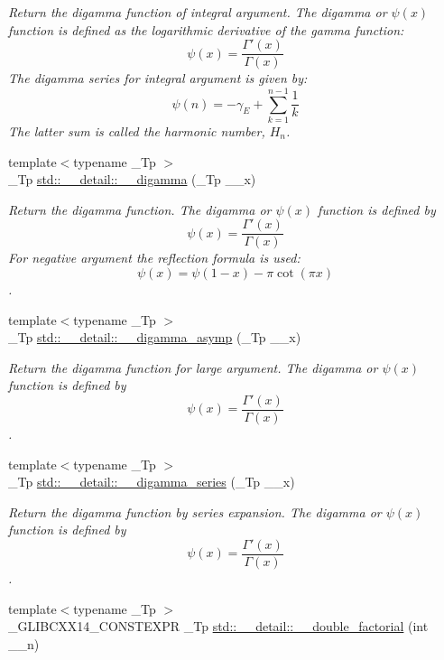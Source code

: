 \begin{DoxyCompactItemize}
\begin{DoxyCompactList}\small\item\em Return the digamma function of integral argument. The digamma or $ \psi(x) $ function is defined as the logarithmic derivative of the gamma function\+: \[ \psi(x) = \frac{\Gamma'(x)}{\Gamma(x)} \] The digamma series for integral argument is given by\+: \[ \psi(n) = -\gamma_E + \sum_{k=1}^{n-1} \frac{1}{k} \] The latter sum is called the harmonic number, $ H_n $. \end{DoxyCompactList}\item 
{\footnotesize template$<$typename \+\_\+\+Tp $>$ }\\\+\_\+\+Tp \hyperlink{namespacestd_1_1____detail_af83cdc6dd8c24e164b8c71491c4b0080}{std\+::\+\_\+\+\_\+detail\+::\+\_\+\+\_\+digamma} (\+\_\+\+Tp \+\_\+\+\_\+x)
\begin{DoxyCompactList}\small\item\em Return the digamma function. The digamma or $ \psi(x) $ function is defined by \[ \psi(x) = \frac{\Gamma'(x)}{\Gamma(x)} \] For negative argument the reflection formula is used\+: \[ \psi(x) = \psi(1-x) - \pi \cot(\pi x) \]. \end{DoxyCompactList}\item 
{\footnotesize template$<$typename \+\_\+\+Tp $>$ }\\\+\_\+\+Tp \hyperlink{namespacestd_1_1____detail_a5264ad32c92b701acb90b543a1a96521}{std\+::\+\_\+\+\_\+detail\+::\+\_\+\+\_\+digamma\+\_\+asymp} (\+\_\+\+Tp \+\_\+\+\_\+x)
\begin{DoxyCompactList}\small\item\em Return the digamma function for large argument. The digamma or $ \psi(x) $ function is defined by \[ \psi(x) = \frac{\Gamma'(x)}{\Gamma(x)} \]. \end{DoxyCompactList}\item 
{\footnotesize template$<$typename \+\_\+\+Tp $>$ }\\\+\_\+\+Tp \hyperlink{namespacestd_1_1____detail_ae9d54f73a3e05c2b242e992a0a93d5de}{std\+::\+\_\+\+\_\+detail\+::\+\_\+\+\_\+digamma\+\_\+series} (\+\_\+\+Tp \+\_\+\+\_\+x)
\begin{DoxyCompactList}\small\item\em Return the digamma function by series expansion. The digamma or $ \psi(x) $ function is defined by \[ \psi(x) = \frac{\Gamma'(x)}{\Gamma(x)} \]. \end{DoxyCompactList}\item 
{\footnotesize template$<$typename \+\_\+\+Tp $>$ }\\\+\_\+\+G\+L\+I\+B\+C\+X\+X14\+\_\+\+C\+O\+N\+S\+T\+E\+X\+PR \+\_\+\+Tp \hyperlink{namespacestd_1_1____detail_a06b0d9786afff0919c96f61d5f760c5f}{std\+::\+\_\+\+\_\+detail\+::\+\_\+\+\_\+double\+\_\+factorial} (int \+\_\+\+\_\+n)

\end{DoxyCompactItemize}
